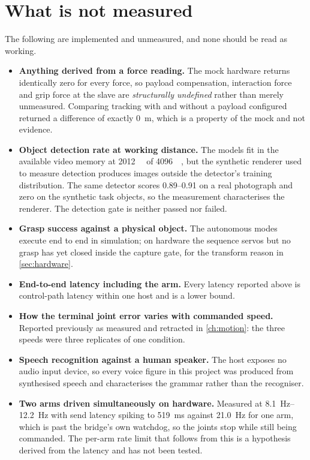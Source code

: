 \section{What is not measured}

The following are implemented and unmeasured, and none should be read as
working.

\begin{itemize}
  \item \textbf{Anything derived from a force reading.} The mock hardware
    returns identically zero for every force, so payload compensation,
    interaction force and grip force at the slave are \emph{structurally
    undefined} rather than merely unmeasured. Comparing tracking with and
    without a payload configured returned a difference of exactly
    \SI{0}{\metre}, which is a property of the mock and not evidence.
  \item \textbf{Object detection rate at working distance.} The models fit in
    the available video memory at \SI{2012}{\mebi\byte} of \SI{4096}{\mebi\byte},
    but the synthetic renderer used to measure detection produces images
    outside the detector's training distribution. The same detector scores
    \numrange{0.89}{0.91} on a real photograph and zero on the synthetic task
    objects, so the measurement characterises the renderer. The detection gate
    is neither passed nor failed.
  \item \textbf{Grasp success against a physical object.} The autonomous
    modes execute end to end in simulation; on hardware the sequence servos
    but no grasp has yet closed inside the capture gate, for the transform
    reason in \cref{sec:hardware}.
  \item \textbf{End-to-end latency including the arm.} Every latency reported
    above is control-path latency within one host and is a lower bound.
  \item \textbf{How the terminal joint error varies with commanded speed.}
    Reported previously as measured and retracted in \cref{ch:motion}: the
    three speeds were three replicates of one condition.
  \item \textbf{Speech recognition against a human speaker.} The host exposes
    no audio input device, so every voice figure in this project was produced
    from synthesised speech and characterises the grammar rather than the
    recogniser.
  \item \textbf{Two arms driven simultaneously on hardware.} Measured at
    \SIrange{8.1}{12.2}{\hertz} with send latency spiking to
    \SI{519}{\milli\second} against \SI{21.0}{\hertz} for one arm, which is
    past the bridge's own watchdog, so the joints stop while still being
    commanded. The per-arm rate limit that follows from this is a hypothesis
    derived from the latency and has not been tested.
\end{itemize}
